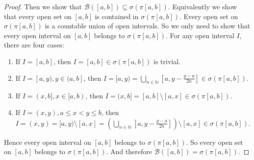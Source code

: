 \documentclass[a4paper, linespread=1.5]{article}
\newcommand{\Natural}{\mathbb{N}}
\newcommand{\BorelSet}{\mathcal{B}}
\begin{document}
\begin{proof}
        Then we show that $\BorelSet([a, b]) \subseteq \sigma(\pi[a, b])$. Equivalently we show that every open set on $[a, b]$ is contained in $\sigma(\pi[a, b])$. Every open set on $\sigma(\pi[a, b])$ is a countable union of open intervals. So we only need to show that every open interval on $[a, b]$ belongs to $\sigma(\pi[a, b])$. For any open interval $I$, there are four cases:
        \begin{enumerate}
            \item If $I = [a, b]$, then $I = [a, b] \in \sigma(\pi[a, b])$ is trivial.
            \item If $I = [a, y), y \in (a, b]$, then $I = [a, y) = \bigcup_{n \in \Natural} [a, y - \frac{y - a}{2n}] \in \sigma(\pi[a, b])$.
            \item If $I = (x, b], x \in [a, b)$, then $I = (x, b] = [a, b] \setminus [a, x] \in \sigma(\pi[a, b])$.
            \item If $I = (x, y), a \leqslant x < y \leqslant b$, then $I = (x, y) = [a, y) \setminus [a, x] = (\bigcup_{n \in \Natural} [a, y - \frac{y - a}{2n}]) \setminus [a, x] \in \sigma(\pi[a, b])$.
        \end{enumerate}
        Hence every open interval on $[a, b]$ belongs to $\sigma(\pi[a, b])$. So every open set on $[a, b]$ belongs to $\sigma(\pi[a, b])$. And therefore $\BorelSet([a, b]) = \sigma(\pi[a, b])$.
    \end{proof}
\end{document}
